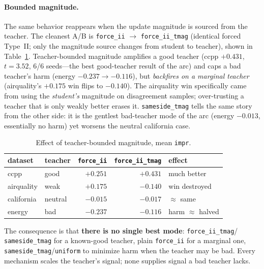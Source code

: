 \paragraph{Bounded magnitude.}
The same behavior reappears when the update magnitude is sourced from the teacher. The
cleanest A/B is \texttt{force\_ii} $\rightarrow$ \texttt{force\_ii\_tmag} (identical
forced Type~II; only the magnitude source changes from student to teacher), shown in
Table~\ref{tab:tmag}. Teacher-bounded magnitude amplifies a good teacher (ccpp $+0.431$,
$t=3.52$, 6/6 seeds---the best good-teacher result of the arc) and caps a bad teacher's
harm (energy $-0.237 \rightarrow -0.116$), but \emph{backfires on a marginal teacher}
(airquality's $+0.175$ win flips to $-0.140$). The airquality win specifically came from
using the \emph{student's} magnitude on disagreement samples; over-trusting a teacher
that is only weakly better erases it. \texttt{sameside\_tmag} tells the same story from
the other side: it is the gentlest bad-teacher mode of the arc (energy $-0.013$,
essentially no harm) yet worsens the neutral california case.

\begin{table}[t]
\centering
\footnotesize
\caption{Effect of teacher-bounded magnitude, mean \texttt{impr}.}
\label{tab:tmag}
\begin{tabular}{llrr l}
\toprule
dataset & teacher & \texttt{force\_ii} & \texttt{force\_ii\_tmag} & effect \\
\midrule
ccpp       & good    & $+0.251$ & $\mathbf{+0.431}$ & much better \\
airquality & weak    & $\mathbf{+0.175}$ & $\mathbf{-0.140}$ & win destroyed \\
california & neutral & $-0.015$ & $-0.017$ & $\approx$ same \\
energy     & bad     & $-0.237$ & $-0.116$ & harm $\approx$ halved \\
\bottomrule
\end{tabular}
\end{table}

The consequence is that \textbf{there is no single best mode}: \texttt{force\_ii\_tmag}/
\texttt{sameside\_tmag} for a known-good teacher, plain \texttt{force\_ii} for a marginal
one, \texttt{sameside\_tmag}/\texttt{uniform} to minimize harm when the teacher may be
bad. Every mechanism scales the teacher's signal; none supplies signal a bad teacher
lacks.
